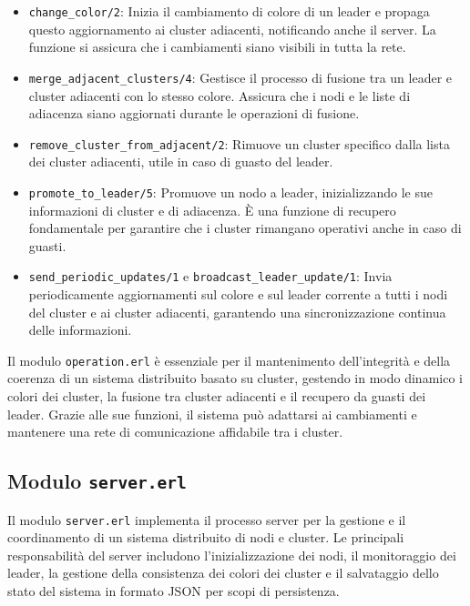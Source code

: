 \documentclass[12pt, a4paper]{report}
\begin{document}
\begin{itemize}
    \item \texttt{change\_color/2}: Inizia il cambiamento di colore di un leader e propaga questo aggiornamento ai cluster adiacenti, notificando anche il server. La funzione si assicura che i cambiamenti siano visibili in tutta la rete.

    \item \texttt{merge\_adjacent\_clusters/4}: Gestisce il processo di fusione tra un leader e cluster adiacenti con lo stesso colore. Assicura che i nodi e le liste di adiacenza siano aggiornati durante le operazioni di fusione.

    \item \texttt{remove\_cluster\_from\_adjacent/2}: Rimuove un cluster specifico dalla lista dei cluster adiacenti, utile in caso di guasto del leader.

    \item \texttt{promote\_to\_leader/5}: Promuove un nodo a leader, inizializzando le sue informazioni di cluster e di adiacenza. È una funzione di recupero fondamentale per garantire che i cluster rimangano operativi anche in caso di guasti.

    \item \texttt{send\_periodic\_updates/1} e \texttt{broadcast\_leader\_update/1}: Invia periodicamente aggiornamenti sul colore e sul leader corrente a tutti i nodi del cluster e ai cluster adiacenti, garantendo una sincronizzazione continua delle informazioni.

\end{itemize}

\noindent
Il modulo \texttt{operation.erl} è essenziale per il mantenimento dell'integrità e della coerenza di un sistema distribuito basato su cluster, gestendo in modo dinamico i colori dei cluster, la fusione tra cluster adiacenti e il recupero da guasti dei leader. Grazie alle sue funzioni, il sistema può adattarsi ai cambiamenti e mantenere una rete di comunicazione affidabile tra i cluster.


\subsection{Modulo \texttt{server.erl}}

Il modulo \texttt{server.erl} implementa il processo server per la gestione e il coordinamento di un sistema distribuito di nodi e cluster. Le principali responsabilità del server includono l'inizializzazione dei nodi, il monitoraggio dei leader, la gestione della consistenza dei colori dei cluster e il salvataggio dello stato del sistema in formato JSON per scopi di persistenza.
\end{document}
